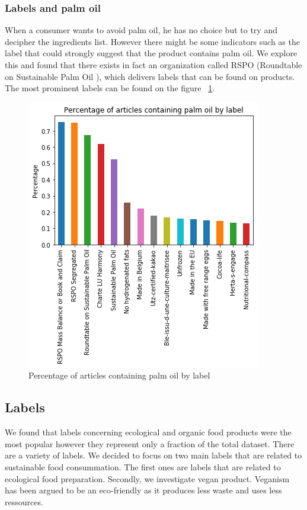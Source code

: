 \documentclass[11pt]{article}
\begin{document}
\subsubsection{Labels and palm oil}
When a consumer wants to avoid palm oil, he has no choice but to try and decipher the ingredients list. However there might be some indicators such as the label that could strongly suggest that the product contains palm oil. We explore this and found that there exists in fact an organization called RSPO (Roundtable on Sustainable Palm Oil ), which delivers labels that can be found on products. The most prominent labels can be found on the figure ~\ref{fig:normal_lab_palm_oil}. 

\vspace{-0.3cm}
\begin{figure}[H]
    \centering
    \includegraphics[scale=0.4]{figures/palm_oil_labels_normalized_2.png}
    \caption{Percentage of articles containing palm oil by label}
    \label{fig:normal_lab_palm_oil}
\end{figure}


\subsection{Labels}
We found that labels concerning ecological and organic food products were the most popular however they represent only a fraction of the total dataset. There are a variety of labels. We decided to focus on two main labels that are related to sustainable food consummation. The first ones are labels that are related to ecological food preparation. Secondly, we investigate vegan product. Veganism has been argued to be an eco-friendly as it produces less waste and uses less ressources. 
\end{document}
